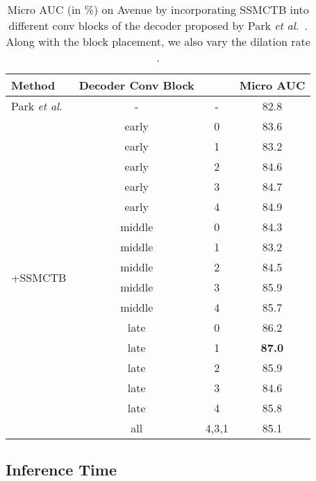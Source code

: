 \documentclass[10pt,journal,compsoc]{IEEEtran}
\newcommand{\etal}{\textit{et al}.}
\begin{document}
\begin{table}[t]
\centering 
\caption{Micro AUC (in \%) on Avenue by incorporating SSMCTB into different conv blocks of the decoder proposed by Park \etal~\cite{Park-CVPR-2020}. Along with the block placement, we also vary the dilation rate .}
\vspace{-0.2cm}
\setlength\tabcolsep{2.5pt}
\small
\begin{tabular}{| l | c | c | c | } 
\hline
Method & Decoder Conv Block &  & {Micro AUC} \\
 \hline \hline
{Park \etal~\cite{Park-CVPR-2020}} & - & - & 82.8 \\
\hline
\multirow{16}{*}{+SSMCTB} & early & 0 & 83.6 \\
& early & 1 & 83.2 \\
& early & 2 & 84.6  \\
& early & 3 & 84.7  \\
& early & 4 & 84.9  \\
\cline{2-4}
& middle & 0 & 84.3  \\
& middle & 1 & 83.2  \\
& middle & 2 & 84.5  \\
& middle & 3 & 85.9  \\
& middle & 4 & 85.7  \\
\cline{2-4}
& late & 0 & 86.2  \\
& late & 1 & \textbf{87.0}  \\
& late & 2 & 85.9  \\
& late & 3 & 84.6   \\
& late & 4 & 85.8   \\
\cline{2-4}
& all & 4,3,1 & 85.1 \\
\hline 
\end{tabular}
\vspace{-0.2cm}
\label{table:ablation1_avenue} \end{table}

\subsection{Inference Time}
\end{document}
